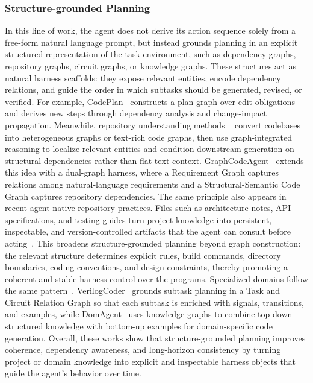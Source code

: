 \subsubsection{Structure-grounded Planning}
In this line of work, the agent does not derive its action sequence solely from a free-form natural language prompt, but instead grounds planning in an explicit structured representation of the task environment, such as dependency graphs, repository graphs, circuit graphs, or knowledge graphs. These structures act as natural harness scaffolds: they expose relevant entities, encode dependency relations, and guide the order in which subtasks should be generated, revised, or verified. For example, CodePlan~\cite{bairi2024codeplan} constructs a plan graph over edit obligations and derives new steps through dependency analysis and change-impact propagation. Meanwhile, repository understanding methods ~\cite{luo2025rpg,chen2025locagent,tao2025cgm,luo2025rpg} convert codebases into heterogeneous graphs or text-rich code graphs, then use graph-integrated reasoning to localize relevant entities and condition downstream generation on structural dependencies rather than flat text context. GraphCodeAgent~\cite{li2025graphcodeagent} extends this idea with a dual-graph harness, where a Requirement Graph captures relations among natural-language requirements and a Structural-Semantic Code Graph captures repository dependencies. 
The same principle also appears in recent agent-native repository practices. Files such as architecture notes, API specifications, and testing guides turn project knowledge into persistent, inspectable, and version-controlled artifacts that the agent can consult before acting~\cite{agentsmd2025,openai2026agentsmd,anthropic2025claudememory}. This broadens structure-grounded planning beyond graph construction: the relevant structure determines explicit rules, build commands, directory boundaries, coding conventions, and design constraints, thereby promoting a coherent and stable harness control over the programs. 
Specialized domains follow the same pattern~\cite{wang2026domagent,ho2025verilogcoder}. VerilogCoder~\cite{ho2025verilogcoder} grounds subtask planning in a Task and Circuit Relation Graph so that each subtask is enriched with signals, transitions, and examples, while DomAgent~\cite{wang2026domagent} uses knowledge graphs to combine top-down structured knowledge with bottom-up examples for domain-specific code generation. Overall, these works show that structure-grounded planning improves coherence, dependency awareness, and long-horizon consistency by turning project or domain knowledge into explicit and inspectable harness objects that guide the agent's behavior over time.

